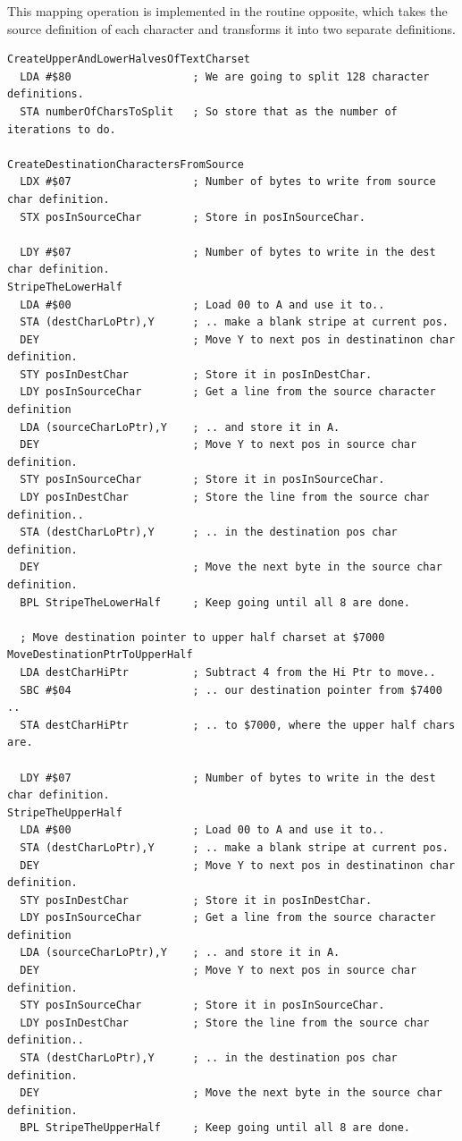 This mapping operation is implemented in the routine opposite, which takes the source definition of each character and
transforms it into two separate definitions.
\clearpage
\begin{lstlisting}[basicstyle=\scriptsize\ttfamily, escapechar=\%]
CreateUpperAndLowerHalvesOfTextCharset
  LDA #$80                   ; We are going to split 128 character definitions.
  STA numberOfCharsToSplit   ; So store that as the number of iterations to do.

CreateDestinationCharactersFromSource   
  LDX #$07                   ; Number of bytes to write from source char definition.
  STX posInSourceChar        ; Store in posInSourceChar.

  LDY #$07                   ; Number of bytes to write in the dest char definition.
StripeTheLowerHalf   
  LDA #$00                   ; Load 00 to A and use it to..
  STA (destCharLoPtr),Y      ; .. make a blank stripe at current pos.
  DEY                        ; Move Y to next pos in destinatinon char definition.
  STY posInDestChar          ; Store it in posInDestChar.
  LDY posInSourceChar        ; Get a line from the source character definition
  LDA (sourceCharLoPtr),Y    ; .. and store it in A.
  DEY                        ; Move Y to next pos in source char definition.
  STY posInSourceChar        ; Store it in posInSourceChar.
  LDY posInDestChar          ; Store the line from the source char definition..
  STA (destCharLoPtr),Y      ; .. in the destination pos char definition.
  DEY                        ; Move the next byte in the source char definition.
  BPL StripeTheLowerHalf     ; Keep going until all 8 are done.

  ; Move destination pointer to upper half charset at $7000
MoveDestinationPtrToUpperHalf
  LDA destCharHiPtr          ; Subtract 4 from the Hi Ptr to move..
  SBC #$04                   ; .. our destination pointer from $7400 .. 
  STA destCharHiPtr          ; .. to $7000, where the upper half chars are.

  LDY #$07                   ; Number of bytes to write in the dest char definition.
StripeTheUpperHalf                                                                   
  LDA #$00                   ; Load 00 to A and use it to..
  STA (destCharLoPtr),Y      ; .. make a blank stripe at current pos.
  DEY                        ; Move Y to next pos in destinatinon char definition.
  STY posInDestChar          ; Store it in posInDestChar.
  LDY posInSourceChar        ; Get a line from the source character definition
  LDA (sourceCharLoPtr),Y    ; .. and store it in A.
  DEY                        ; Move Y to next pos in source char definition.
  STY posInSourceChar        ; Store it in posInSourceChar.
  LDY posInDestChar          ; Store the line from the source char definition..
  STA (destCharLoPtr),Y      ; .. in the destination pos char definition.
  DEY                        ; Move the next byte in the source char definition.
  BPL StripeTheUpperHalf     ; Keep going until all 8 are done.


\end{lstlisting}
